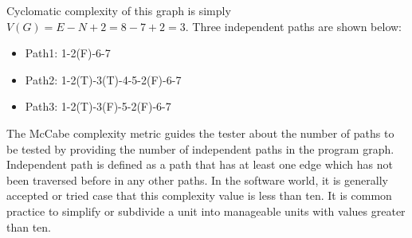 Cyclomatic complexity of this graph is simply $V(G) = E - N + 2 = 8 - 7 + 2 = 3$. Three independent paths are shown below:
\begin{itemize}
    \item Path1: 1-2(F)-6-7
    \item Path2: 1-2(T)-3(T)-4-5-2(F)-6-7
    \item Path3: 1-2(T)-3(F)-5-2(F)-6-7
\end{itemize}

The McCabe complexity metric guides the tester about the number of paths to be tested by providing the number of independent paths in the program graph. Independent path is defined as a path that has at least one edge which has not been traversed before in any other paths. In the  software world, it is generally accepted or tried case that this complexity value is less than ten. It is common practice to simplify or subdivide a unit into manageable units with values greater than ten.

